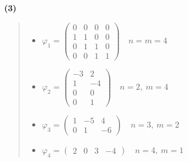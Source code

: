 \documentclass{article}
\begin{document}
\textbf{\textsf{(3)}}
\begin{quote}
   \begin{itemize}
       \item $\varphi_1 = \begin{pmatrix} 0  & 0 & 0 & 0 \\ 1 & 1 & 0 & 0 \\ 0 & 1 & 1 & 0 \\ 0 & 0 & 1 & 1\end{pmatrix} \quad n = m = 4$

       \item $\varphi_2 = \begin{pmatrix} -3  & 2  \\ 1 & -4\\  0 & 0 \\  0 & 1\end{pmatrix} \quad n = 2, \ m = 4$

       
       \item $\varphi_3 = \begin{pmatrix} 1 & -5 & 4 \\ 0 & 1 & -6 \end{pmatrix} \quad n = 3, \ m = 2$
       
       \item $\varphi_4 = \begin{pmatrix} 2 & 0 & 3 & -4 \end{pmatrix} \quad n = 4, \ m = 1$
   \end{itemize} 
\end{quote}
\end{document}
